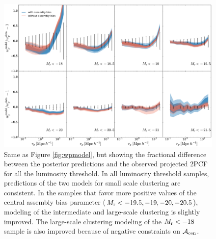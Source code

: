\begin{figure}[p]~\\
\begin{center}
\includegraphics[width=\textwidth]{wpres.pdf}
\caption{Same as Figure \ref{fig:wpmodel}, but showing the fractional difference between the posterior predictions and the observed projected 2PCF for all the luminosity threshold. In all luminosity threshold samples, predictions of the two models for small scale clustering are consistent. In the samples that favor more positive values of the central assembly bias parameter ($M_{\rm r}<-19.5,-19,-20,-20.5$), modeling of the intermediate and large-scale clustering is slightly improved. The large-scale clustering modeling of the $M_{\rm r}<-18$ sample is also improved because of negative constraints on $\mathcal{A}_{\rm cen}$.}
\label{fig:wpres}
\end{center}
\end{figure}

\clearpage

